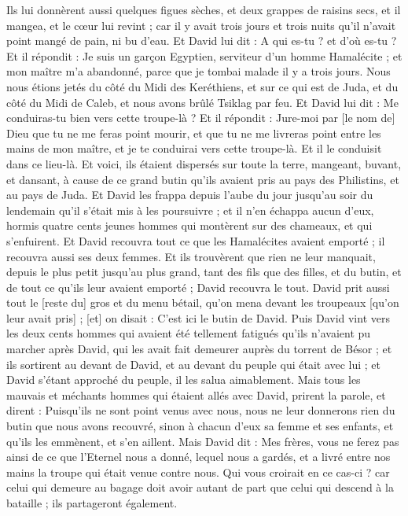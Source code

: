 \begin{multicols}{2}
Ils lui donnèrent aussi quelques figues sèches, et deux grappes de raisins secs, et il mangea, et le cœur lui revint ; car il y avait trois jours et trois nuits qu'il n'avait point mangé de pain, ni bu d'eau.
Et David lui dit : A qui es-tu ? et d'où es-tu ? Et il répondit : Je suis un garçon Egyptien, serviteur d'un homme Hamalécite ; et mon maître m'a abandonné, parce que je tombai malade il y a trois jours.
Nous nous étions jetés du côté du Midi des Keréthiens, et sur ce qui est de Juda, et du côté du Midi de Caleb, et nous avons brûlé Tsiklag par feu.
Et David lui dit : Me conduiras-tu bien vers cette troupe-là ? Et il répondit : Jure-moi par [le nom de] Dieu que tu ne me feras point mourir, et que tu ne me livreras point entre les mains de mon maître, et je te conduirai vers cette troupe-là.
Et il le conduisit dans ce lieu-là. Et voici, ils étaient dispersés sur toute la terre, mangeant, buvant, et dansant, à cause de ce grand butin qu'ils avaient pris au pays des Philistins, et au pays de Juda.
Et David les frappa depuis l'aube du jour jusqu'au soir du lendemain qu'il s'était mis à les poursuivre ; et il n'en échappa aucun d'eux, hormis quatre cents jeunes hommes qui montèrent sur des chameaux, et qui s'enfuirent.
Et David recouvra tout ce que les Hamalécites avaient emporté ; il recouvra aussi ses deux femmes.
Et ils trouvèrent que rien ne leur manquait, depuis le plus petit jusqu'au plus grand, tant des fils que des filles, et du butin, et de tout ce qu'ils leur avaient emporté ; David recouvra le tout.
David prit aussi tout le [reste du] gros et du menu bétail, qu'on mena devant les troupeaux [qu'on leur avait pris] ; [et] on disait : C'est ici le butin de David.
Puis David vint vers les deux cents hommes qui avaient été tellement fatigués qu'ils n'avaient pu marcher après David, qui les avait fait demeurer auprès du torrent de Bésor ; et ils sortirent au devant de David, et au devant du peuple qui était avec lui ; et David s'étant approché du peuple, il les salua aimablement.
Mais tous les mauvais et méchants hommes qui étaient allés avec David, prirent la parole, et dirent : Puisqu'ils ne sont point venus avec nous, nous ne leur donnerons rien du butin que nous avons recouvré, sinon à chacun d'eux sa femme et ses enfants, et qu'ils les emmènent, et s'en aillent.
Mais David dit : Mes frères, vous ne ferez pas ainsi de ce que l'Eternel nous a donné, lequel nous a gardés, et a livré entre nos mains la troupe qui était venue contre nous.
Qui vous croirait en ce cas-ci ? car celui qui demeure au bagage doit avoir autant de part que celui qui descend à la bataille ; ils partageront également.

\end{multicols}
